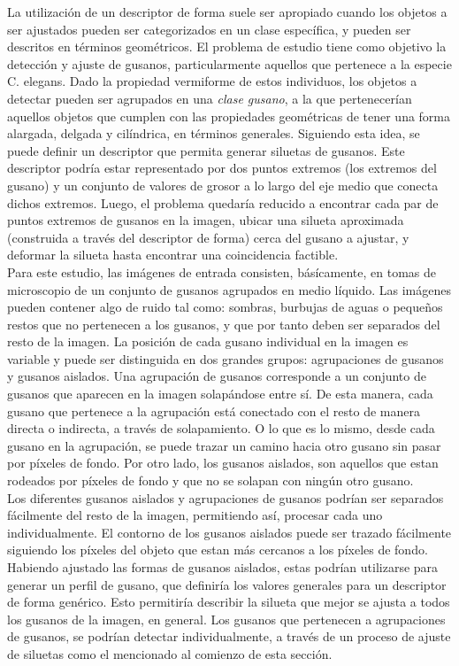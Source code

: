 La utilizaci\'on de un descriptor de forma suele ser apropiado
cuando los objetos a ser ajustados pueden ser categorizados
en un clase espec\'ifica, y pueden ser descritos
en t\'erminos geom\'etricos.
El problema de estudio tiene como objetivo la detecci\'on y ajuste
de gusanos, particularmente aquellos que pertenece a la especie
C. elegans. Dado la propiedad vermiforme de estos individuos, los
objetos a detectar pueden ser agrupados en una \emph{clase gusano},
a la que pertenecer\'ian aquellos objetos que cumplen con las propiedades
geom\'etricas de tener una forma alargada, delgada y cil\'indrica, en
t\'erminos generales.
Siguiendo esta idea, se puede definir un descriptor que 
permita generar siluetas de gusanos. Este descriptor podr\'ia
estar representado por dos puntos extremos (los extremos del gusano)
y un conjunto de valores de grosor a lo largo del eje medio que
conecta dichos extremos. Luego, el problema quedar\'ia
reducido a encontrar cada par de puntos extremos de gusanos en la
imagen, ubicar una silueta aproximada (construida a trav\'es
del descriptor de forma) cerca del gusano a ajustar, y deformar 
la silueta hasta encontrar una coincidencia factible.\\

Para este estudio, las im\'agenes de entrada consisten, b\'as\'icamente, en
tomas de microscopio de un conjunto de gusanos agrupados en medio 
l\'iquido. Las im\'agenes pueden contener algo de ruido tal como: 
sombras, burbujas de aguas o peque\~nos restos que no pertenecen a
los gusanos, y que por tanto deben ser separados del resto de la imagen. La
posici\'on de cada gusano individual en la imagen es variable y puede
ser distinguida en dos grandes grupos: agrupaciones de gusanos y gusanos aislados.
Una agrupaci\'on de gusanos corresponde a un conjunto de gusanos que aparecen en la
imagen solap\'andose entre s\'i. De esta manera, cada gusano que pertenece
a la agrupaci\'on est\'a conectado con el resto de manera directa o indirecta,
 a trav\'es de solapamiento. O lo que es lo mismo, desde cada gusano en la agrupaci\'on,
se puede trazar un camino hacia otro gusano sin pasar por p\'ixeles de fondo.  
Por otro lado, los gusanos aislados, son aquellos que estan rodeados por
p\'ixeles de fondo y que no se solapan con ning\'un otro gusano.\\

Los diferentes gusanos aislados y agrupaciones de gusanos podr\'ian ser
separados f\'acilmente del resto de la imagen, permitiendo as\'i, 
procesar cada uno individualmente. El contorno de los gusanos aislados
puede ser trazado f\'acilmente siguiendo los p\'ixeles del objeto que
estan m\'as cercanos a los p\'ixeles de fondo. Habiendo ajustado las formas
de gusanos aislados, estas podr\'ian utilizarse para generar un perfil
de gusano, que definir\'ia los valores generales para un descriptor de forma
gen\'erico. Esto permitir\'ia describir la silueta que mejor se ajusta a todos
los gusanos de la imagen, en general.
Los gusanos que pertenecen a agrupaciones de gusanos, se podr\'ian detectar
individualmente, a trav\'es de un proceso de ajuste de siluetas como
el mencionado al comienzo de esta secci\'on.

